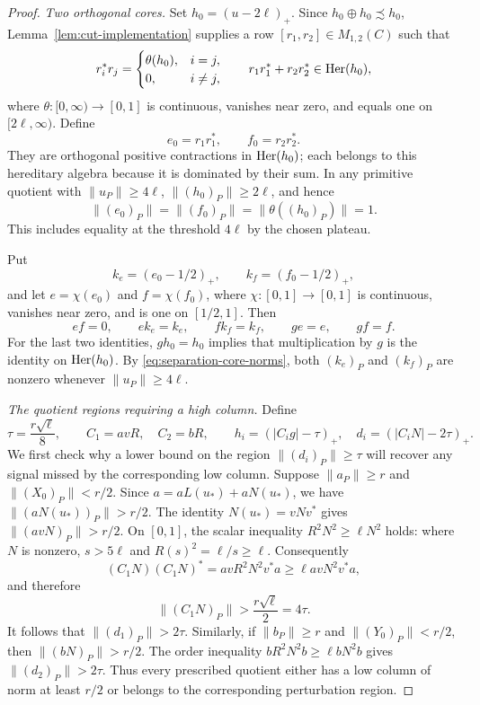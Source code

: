 \begin{proof}
\medskip\noindent\textit{Two orthogonal cores.}
Set $h_0=(u-2\ell)_+$.  Since $h_0\oplus h_0\precsim h_0$,
Lemma~\ref{lem:cut-implementation} supplies a row
$[r_1,r_2]\in M_{1,2}(C)$ such that
\begin{equation}\label{eq:separation-exact-cores}
 r_i^*r_j=\begin{cases}\theta(h_0),&i=j,\\0,&i\ne j,\end{cases}
 \qquad r_1r_1^*+r_2r_2^*\in\operatorname{Her}(h_0),
\end{equation}
where $\theta\colon[0,\infty)\to[0,1]$ is continuous, vanishes near
zero, and equals one on $[2\ell,\infty)$.  Define
\[
 e_0=r_1r_1^*,\qquad f_0=r_2r_2^*.
\]
They are orthogonal positive contractions in $\operatorname{Her}(h_0)$; each belongs
to this hereditary algebra because it is dominated by their sum.
In any primitive quotient with $\|u_P\|\ge4\ell$,
$\|(h_0)_P\|\ge2\ell$, and hence
\begin{equation}\label{eq:separation-core-norms}
 \|(e_0)_P\|=\|(f_0)_P\|=\|\theta((h_0)_P)\|=1.
\end{equation}
This includes equality at the threshold $4\ell$ by the chosen plateau.

Put
\[
 k_e=(e_0-1/2)_+,\qquad k_f=(f_0-1/2)_+,
\]
and let $e=\chi(e_0)$ and $f=\chi(f_0)$, where
$\chi\colon[0,1]\to[0,1]$ is continuous, vanishes near zero, and
is one on $[1/2,1]$.
Then
\begin{equation}\label{eq:separation-core-identities}
 ef=0,\qquad ek_e=k_e,\qquad fk_f=k_f,\qquad ge=e,\qquad gf=f.
\end{equation}
For the last two identities, $gh_0=h_0$ implies that multiplication
by $g$ is the identity on $\operatorname{Her}(h_0)$.
By \eqref{eq:separation-core-norms}, both $(k_e)_P$ and $(k_f)_P$
are nonzero whenever $\|u_P\|\ge4\ell$.

\medskip\noindent\textit{The quotient regions requiring a high column.}
Define
\begin{equation}\label{eq:separation-normalization-data}
 \tau=\frac{r\sqrt\ell}{8},\qquad
 C_1=avR,\quad C_2=bR,\qquad
 h_i=(|C_ig|-\tau)_+,\quad d_i=(|C_iN|-2\tau)_+.
\end{equation}
We first check why a lower bound on the region
$\|(d_i)_P\|\ge\tau$ will recover any signal missed by the
corresponding low column.
Suppose $\|a_P\|\ge r$ and $\|(X_0)_P\|<r/2$.
Since $a=aL(u_*)+aN(u_*)$, we have
$\|(aN(u_*))_P\|>r/2$.
The identity $N(u_*)=vNv^*$ gives $\|(avN)_P\|>r/2$.
On $[0,1]$, the scalar inequality $R^2N^2\ge\ell N^2$ holds:
where $N$ is nonzero, $s>5\ell$ and $R(s)^2=\ell/s\ge\ell$.
Consequently
\[
 (C_1N)(C_1N)^*
 =avR^2N^2v^*a
 \ge\ell avN^2v^*a,
\]
and therefore
\[
 \|(C_1N)_P\|>\frac{r\sqrt\ell}{2}=4\tau.
\]
It follows that $\|(d_1)_P\|>2\tau$.
Similarly, if $\|b_P\|\ge r$ and $\|(Y_0)_P\|<r/2$,
then $\|(bN)_P\|>r/2$.  The order inequality
$bR^2N^2b\ge\ell bN^2b$ gives $\|(d_2)_P\|>2\tau$.
Thus every prescribed quotient either has a low column of norm at
least $r/2$ or belongs to the corresponding perturbation region.


\end{proof}
